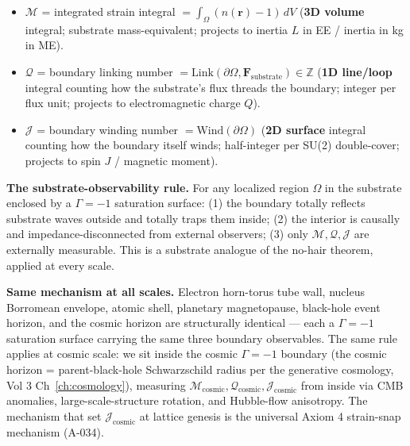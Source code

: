\begin{itemize}\itemsep 0pt
    \item $\mathcal{M}$ \;=\; integrated strain integral $= \int_\Omega (n(\mathbf{r}) - 1)\, dV$ \;\; (\textbf{3D volume} integral; substrate mass-equivalent; projects to inertia $L$ in EE / inertia in kg in ME).
    \item $\mathcal{Q}$ \;=\; boundary linking number $= \mathrm{Link}(\partial\Omega, \mathbf{F}_{\text{substrate}}) \in \mathbb{Z}$ \;\; (\textbf{1D line/loop} integral counting how the substrate's flux threads the boundary; integer per flux unit; projects to electromagnetic charge $Q$).
    \item $\mathcal{J}$ \;=\; boundary winding number $= \mathrm{Wind}(\partial\Omega)$ \;\; (\textbf{2D surface} integral counting how the boundary itself winds; half-integer per SU(2) double-cover; projects to spin $J$ / magnetic moment).
\end{itemize}

\noindent\textbf{The substrate-observability rule.} For any localized region $\Omega$ in the substrate enclosed by a $\Gamma = -1$\gammaundeclared{} saturation surface: (1) the boundary totally reflects substrate waves outside and totally traps them inside; (2) the interior is causally and impedance-disconnected from external observers; (3) only $\mathcal{M}, \mathcal{Q}, \mathcal{J}$ are externally measurable. This is a substrate analogue of the no-hair theorem, applied at every scale.

\noindent\textbf{Same mechanism at all scales.} Electron horn-torus tube wall, nucleus Borromean envelope, atomic shell, planetary magnetopause, black-hole event horizon, and the cosmic horizon are structurally identical --- each a $\Gamma = -1$\gammaundeclared{} saturation surface carrying the same three boundary observables. The same rule applies at cosmic scale: we sit inside the cosmic $\Gamma = -1$\gammaundeclared{} boundary (the cosmic horizon = parent-black-hole Schwarzschild radius per the generative cosmology, Vol 3 Ch~\ref{ch:cosmology}), measuring $\mathcal{M}_{\text{cosmic}}, \mathcal{Q}_{\text{cosmic}}, \mathcal{J}_{\text{cosmic}}$ from inside via CMB anomalies, large-scale-structure rotation, and Hubble-flow anisotropy. The mechanism that set $\mathcal{J}_{\text{cosmic}}$ at lattice genesis is the universal Axiom 4 strain-snap mechanism (A-034).

